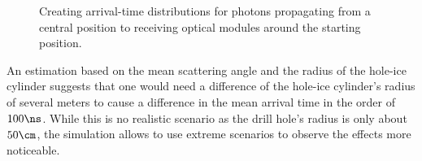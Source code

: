 
\begin{figure}[htbp]
  \hfill
  \caption{Creating arrival-time distributions for photons propagating from a central position to receiving optical modules around the starting position.}
  \label{fig:eipau6Ag}
\end{figure}


An estimation based on the mean scattering angle and the radius of the hole-ice cylinder suggests that one would need a difference of the hole-ice cylinder's radius of several meters to cause a difference in the mean arrival time in the order of $100\ns$. While this is no realistic scenario as the drill hole's radius is only about $50\cm$, the simulation allows to use extreme scenarios to observe the effects more noticeable.

